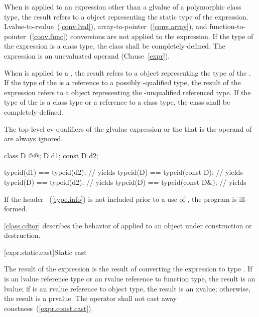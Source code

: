 \pnum
When  is applied to an expression other than a glvalue of
a polymorphic class type, the result refers to a 
object representing the static type of the expression.
Lvalue-to-rvalue~(\ref{conv.lval}), array-to-pointer~(\ref{conv.array}),
and function-to-pointer~(\ref{conv.func}) conversions are not applied to
the expression.
%
If the type of the expression is a class type, the class shall be
completely-defined. The expression is an unevaluated operand
(Clause~\ref{expr}).

\pnum
When  is applied to a , the result
refers to a  object representing the type of the
. If the type of the  is a reference
to a possibly -qualified type, the result of the
 expression refers to a  object
representing the -unqualified referenced type. If the type of
the  is a class type or a reference to a class type,
the class shall be completely-defined.

\pnum
The top-level cv-qualifiers of the glvalue expression or the
 that is the operand of  are always
ignored.
\enterexample 

\begin{codeblock}
class D @@;
D d1;
const D d2;

typeid(d1) == typeid(d2);       // yields 
typeid(D)  == typeid(const D);  // yields 
typeid(D)  == typeid(d2);       // yields 
typeid(D)  == typeid(const D&); // yields 
\end{codeblock}
\exitexample 

\pnum
If the header ~(\ref{type.info}) is not included prior
to a use of , the program is ill-formed.

\pnum
\enternote
\ref{class.cdtor} describes the behavior of  applied to an
object under construction or destruction.
\exitnote 

[expr.static.cast]{Static cast}

\pnum
{}%
%
The result of the expression  is the result of
converting the expression  to type .
%
%
If  is an lvalue reference type
or an rvalue reference to function type, the result is an lvalue;
if  is an rvalue reference to object type, the result is an xvalue;
otherwise, the result is a prvalue. The  operator shall not cast
away constness~(\ref{expr.const.cast}).

